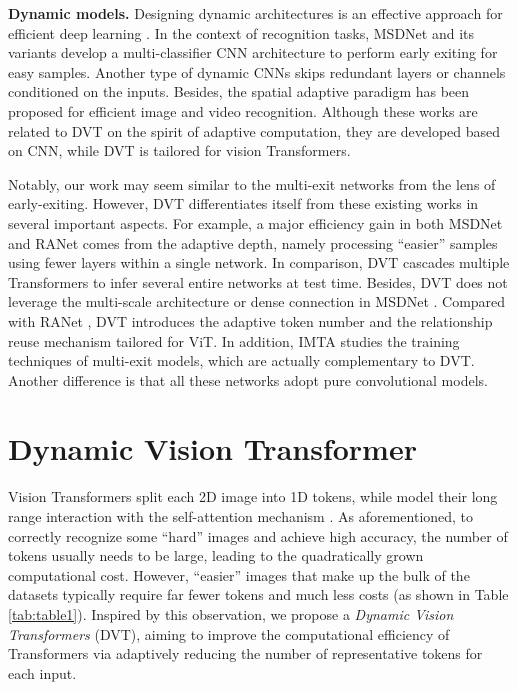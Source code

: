 \documentclass{article}
\begin{document}
\textbf{Dynamic models.}
Designing dynamic architectures is an effective approach for efficient deep learning \cite{han2021dynamic}. In the context of recognition tasks, MSDNet and its variants \cite{huang2017multi, yang2020resolution, li2019improved} develop a multi-classifier CNN architecture to perform early exiting for easy samples. Another type of dynamic CNNs skips redundant layers \cite{veit2018convolutional, wang2018skipnet, wu2018blockdrop} or channels \cite{lin2017runtime} conditioned on the inputs. Besides, the spatial adaptive paradigm \cite{figurnov2017spatially, cao2019seernet, NeurIPS2020_7866, verelst2020dynamic, wang2021adaptive} has been proposed for efficient image and video recognition. Although these works are related to DVT on the spirit of adaptive computation, they are developed based on CNN, while DVT is tailored for vision Transformers.

Notably, our work may seem similar to the multi-exit networks \cite{huang2017multi, yang2020resolution, li2019improved, NeurIPS2020_7866} from the lens of early-exiting. However, DVT differentiates itself from these existing works in several important aspects. For example, a major efficiency gain in both MSDNet \cite{huang2017multi} and RANet \cite{yang2020resolution} comes from the adaptive depth, namely processing ``easier'' samples using fewer layers within a single network. In comparison, DVT cascades multiple Transformers to infer several entire networks at test time. Besides, DVT does not leverage the multi-scale architecture or dense connection in MSDNet \cite{huang2017multi}. Compared with RANet \cite{yang2020resolution}, DVT introduces the adaptive token number and the relationship reuse mechanism tailored for ViT. In addition, IMTA \cite{li2019improved} studies the training techniques of multi-exit models, which are actually complementary to DVT. Another difference is that all these networks \cite{huang2017multi, yang2020resolution, li2019improved, NeurIPS2020_7866} adopt pure convolutional models.
 




\vspace{-1ex}
\section{Dynamic Vision Transformer}
\vspace{-1ex}

Vision Transformers \cite{dosovitskiy2021an, han2021transformer, touvron2020training, yuan2021tokens} split each 2D image into 1D tokens, while model their long range interaction with the self-attention mechanism \cite{NIPS2017_3f5ee243}. As aforementioned, to correctly recognize some ``hard'' images and achieve high accuracy, the number of tokens usually needs to be large, leading to the quadratically grown computational cost. However, ``easier'' images that make up the bulk of the datasets typically require far fewer tokens and much less costs (as shown in Table \ref{tab:table1}). Inspired by this observation, we propose a \emph{Dynamic Vision Transformers} (DVT), aiming to improve the computational efficiency of Transformers via adaptively reducing the number of representative tokens for each input.
\end{document}
